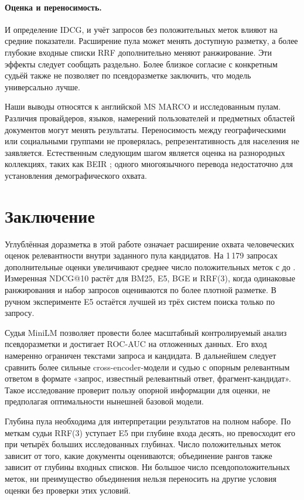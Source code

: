 \documentclass[runningheads,a4paper]{llncs}
\begin{document}
\paragraph{Оценка и переносимость.}
И определение IDCG, и учёт запросов без положительных меток влияют на средние показатели. Расширение пула может менять доступную разметку, а более глубокие входные списки RRF дополнительно меняют ранжирование. Эти эффекты следует сообщать раздельно. Более близкое согласие с конкретным судьёй также не позволяет по псевдоразметке заключить, что модель универсально лучше.

Наши выводы относятся к английской MS MARCO и исследованным пулам. Различия провайдеров, языков, намерений пользователей и предметных областей документов могут менять результаты. Переносимость между географическими или социальными группами не проверялась, репрезентативность для населения не заявляется. Естественным следующим шагом является оценка на разнородных коллекциях, таких как BEIR \cite{thakur2021beir}; одного многоязычного перевода недостаточно для установления демографического охвата.

\section{Заключение}
\label{sec:conclusion}

Углублённая доразметка в этой работе означает расширение охвата человеческих оценок релевантности внутри заданного пула кандидатов. На 1\,179 запросах дополнительные оценки увеличивают среднее число положительных меток с \OriginalMeanRel{} до \HumanMeanRel{}. Измеренная NDCG@10 растёт для BM25, E5, BGE и RRF(3), когда одинаковые ранжирования и набор запросов оцениваются по более плотной разметке. В ручном эксперименте E5 остаётся лучшей из трёх систем поиска только по запросу.

Судья MiniLM позволяет провести более масштабный контролируемый анализ псевдоразметки и достигает ROC-AUC \JudgeTestAuc{} на отложенных данных. Его вход намеренно ограничен текстами запроса и кандидата. В дальнейшем следует сравнить более сильные cross-encoder-модели и судью с опорным релевантным ответом в формате «запрос, известный релевантный ответ, фрагмент-кандидат». Такое исследование проверит пользу опорной информации для оценки, не предполагая оптимальности нынешней базовой модели.

Глубина пула необходима для интерпретации результатов на полном наборе. По меткам судьи RRF(3) уступает E5 при глубине входа десять, но превосходит его при четырёх больших исследованных глубинах. Число положительных меток зависит от того, какие документы оцениваются; объединение рангов также зависит от глубины входных списков. Ни большое число псевдоположительных меток, ни преимущество объединения нельзя переносить на другие условия оценки без проверки этих условий.
\end{document}
